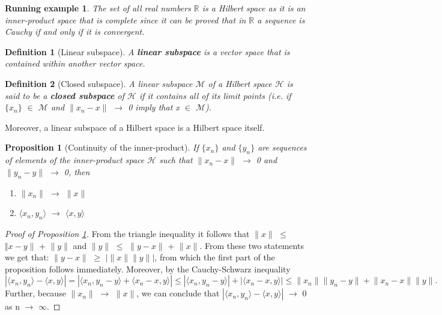 \documentclass{article}
\newtheorem{defn}{Definition}
\newtheorem{prop}{Proposition}
\newtheorem*{exmpl}{Running example}
\begin{document}
\begin{exmpl}
The set of all real numbers $\mathbb{R}$ is a Hilbert space as it is an inner-product space that is complete since it can be proved that in $\mathbb{R}$ a sequence is Cauchy if and only if it is convergent. \newline
\end{exmpl}

\begin{defn}[Linear subspace]
A \textbf{linear subspace} is a vector space that is contained within another vector space. \newline
\end{defn}

\begin{defn}[Closed subspace]
A linear subspace $\mathscr{M}$ of a Hilbert space $\mathscr{H}$ is said to be a \textbf{closed subspace} of $\mathscr{H}$ if it contains all of its limit points (i.e. if $\{x_n\}$ $\in$ $\mathscr{M}$ and $\lVert x_n - x \rVert$ $\rightarrow$ 0 imply that x $\in$ $\mathscr{M}$).  
\end{defn}
Moreover, a linear subspace of a Hilbert space is a Hilbert space itself. \newline

\begin{prop}[Continuity of the inner-product]\label{prop:cip}
 If $\{x_n\}$ and $\{y_n\}$ are sequences of elements of the inner-product space $\mathscr{H}$ such that $\lVert x_n - x \rVert$ $\rightarrow$ 0 and $\lVert y_n - y \rVert$ $\rightarrow$ 0, then 
 \begin{enumerate}
   \item $\lVert x_n \rVert$ $\rightarrow$ $\lVert x \rVert$
   \item $\langle x_n, y_n \rangle$ $\rightarrow$ $\langle x,y \rangle$ 
\end{enumerate}
\end{prop}

\begin{proof}[Proof of Proposition \ref{prop:cip}]
From the triangle inequality it follows that $\lVert x \rVert$ $\leqslant$ $\Vert x - y \rVert$ + $\lVert y \rVert$ and $\lVert y \rVert$ $\leqslant$ $\lVert y - x \rVert$ + $\lVert x \rVert$. From these two statements we get that: $\lVert y - x \rVert$ $\geqslant$ $\left| \lVert  x  \rVert \lVert  y  \rVert \right|$, from which the first part of the proposition follows immediately. Moreover, by the Cauchy-Schwarz inequality
\[
\left|\langle x_n, y_n \rangle - \langle x, y \rangle \right| = \left|\langle x_n, y_n - y \rangle + \langle x_n - x, y \rangle \right| \leqslant \left|\langle x_n, y_n - y \rangle\right|+ \left|\langle x_n - x, y \rangle \right| \leqslant \lVert x_n \rVert \lVert y_n - y\rVert + \lVert x_n - x \rVert \lVert y \rVert.
\] 
Further, because $\lVert x_n \rVert$ $\rightarrow$ $\lVert x \rVert$, we can conclude that $\left|\langle x_n, y_n \rangle - \langle x,y \rangle\right|$ $\rightarrow$ 0 as n $\rightarrow$ $\infty$. \newline
\end{proof}
\end{document}
